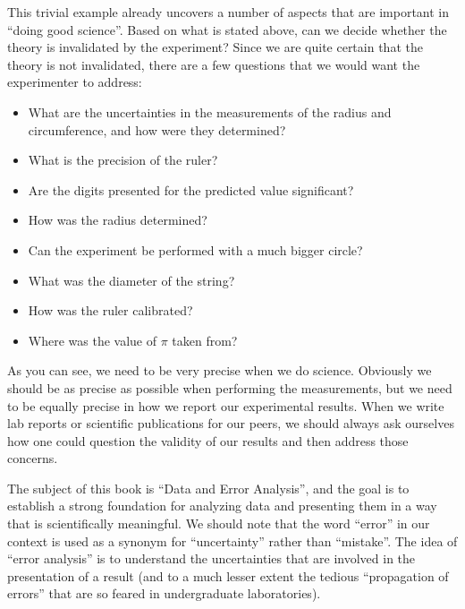 This trivial example already uncovers a number of aspects that are important in ``doing good science''.  Based on what is stated above, can we decide whether the theory is invalidated by the experiment? Since we are quite certain that the theory is not invalidated, there are a few questions that we would want the experimenter to address:
\begin{itemize}
\item What are the uncertainties in the measurements of the radius and circumference, and how were they determined?
\item What is the precision of the ruler?
\item Are the digits presented for the predicted value significant?
\item How was the radius determined?
\item Can the experiment be performed with a much bigger circle? 
\item What was the diameter of the string?
\item How was the ruler calibrated? 
\item Where was the value of $\pi$ taken from?
\end{itemize}

As you can see, we need to be very precise when we do science. Obviously we should be as precise as possible when performing the measurements, but we need to be equally precise in how we report our experimental results. When we write lab reports or scientific publications for our peers, we should always ask ourselves how one could question the validity of our results and then address those concerns.

The subject of this book is ``Data and Error Analysis'', and the goal is to establish a strong foundation for analyzing data and presenting them in a way that is scientifically meaningful. We should note that the word ``error'' in our context is used as a synonym for ``uncertainty'' rather than ``mistake''. The idea of ``error analysis'' is to understand the uncertainties that are involved in the presentation of a result (and to a much lesser extent the tedious ``propagation of errors'' that are so feared in undergraduate laboratories).

